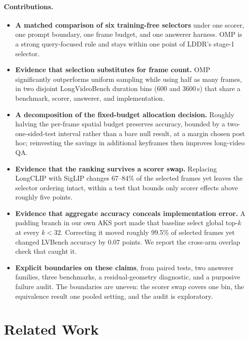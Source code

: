 \documentclass[11pt]{article}
\begin{document}
\paragraph{Contributions.}
\begin{itemize}
  \item \textbf{A matched comparison of six training-free selectors} under one scorer, one prompt boundary, one frame budget, and one answerer harness. OMP is a strong query-focused rule and stays within one point of LDDR's stage-1 selector.
  \item \textbf{Evidence that selection substitutes for frame count.} OMP significantly outperforms uniform sampling while using half as many frames, in two disjoint LongVideoBench duration bins (600 and 3600\,s) that share a benchmark, scorer, answerer, and implementation.
  \item \textbf{A decomposition of the fixed-budget allocation decision.} Roughly halving the per-frame spatial budget preserves accuracy, bounded by a two-one-sided-test interval rather than a bare null result, at a margin chosen post hoc; reinvesting the savings in additional keyframes then improves long-video QA.
  \item \textbf{Evidence that the ranking survives a scorer swap.} Replacing LongCLIP with SigLIP changes 67--84\% of the selected frames yet leaves the selector ordering intact, within a test that bounds only scorer effects above roughly five points.
  \item \textbf{Evidence that aggregate accuracy conceals implementation error.} A padding branch in our own AKS port made that baseline select global top-$k$ at every $k<32$. Correcting it moved roughly 99.5\% of selected frames yet changed LVBench accuracy by 0.07 points. We report the cross-arm overlap check that caught it.
  \item \textbf{Explicit boundaries on these claims}, from paired tests, two answerer families, three benchmarks, a residual-geometry diagnostic, and a purposive failure audit. The boundaries are uneven: the scorer swap covers one bin, the equivalence result one pooled setting, and the audit is exploratory.
\end{itemize}

\section{Related Work}
\end{document}
